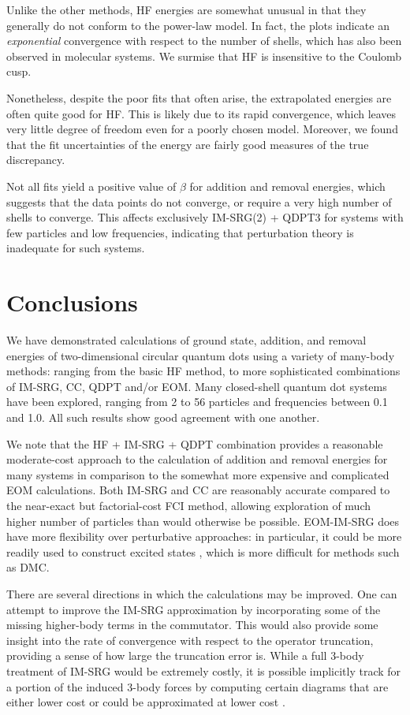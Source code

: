 \documentclass[aip, jcp, 12pt]{revtex4-1}
\begin{document}
Unlike the other methods, HF energies are somewhat unusual in that they generally do not conform to the power-law model.  In fact, the plots indicate an \emph{exponential} convergence with respect to the number of shells, which has also been observed in molecular systems.\cite{HALKIER1999437}  We surmise that HF is insensitive to the Coulomb cusp.

Nonetheless, despite the poor fits that often arise, the extrapolated energies are often quite good for HF.  This is likely due to its rapid convergence, which leaves very little degree of freedom even for a poorly chosen model.  Moreover, we found that the fit uncertainties of the energy are fairly good measures of the true discrepancy.

Not all fits yield a positive value of $\beta$ for addition and removal energies, which suggests that the data points do not converge, or require a very high number of shells to converge.  This affects exclusively IM-SRG(2) + QDPT3 for systems with few particles and low frequencies, indicating that perturbation theory is inadequate for such systems.

\section{Conclusions}
\label{sec:conclusions}

We have demonstrated calculations of ground state, addition, and removal energies of two-dimensional circular quantum dots using a variety of many-body methods: ranging from the basic HF method, to more sophisticated combinations of IM-SRG, CC, QDPT and/or EOM.  Many closed-shell quantum dot systems have been explored, ranging from 2 to 56 particles and frequencies between 0.1 and 1.0.  All such results show good agreement with one another.

We note that the HF + IM-SRG + QDPT combination provides a reasonable moderate-cost approach to the calculation of addition and removal energies for many systems in comparison to the somewhat more expensive and complicated EOM calculations.  Both IM-SRG and CC are reasonably accurate compared to the near-exact but factorial-cost FCI method, allowing exploration of much higher number of particles than would otherwise be possible.  EOM-IM-SRG does have more flexibility over perturbative approaches: in particular, it could be more readily used to construct excited states \cite{PhysRevC.95.044304}, which is more difficult for methods such as DMC.

There are several directions in which the calculations may be improved.  One can attempt to improve the IM-SRG approximation by incorporating some of the missing higher-body terms in the commutator.  This would also provide some insight into the rate of convergence with respect to the operator truncation, providing a sense of how large the truncation error is.  While a full 3-body treatment of IM-SRG would be extremely costly, it is possible implicitly track for a portion of the induced 3-body forces by computing certain diagrams that are either lower cost or could be approximated at lower cost \cite{IMSRG}.
\end{document}
